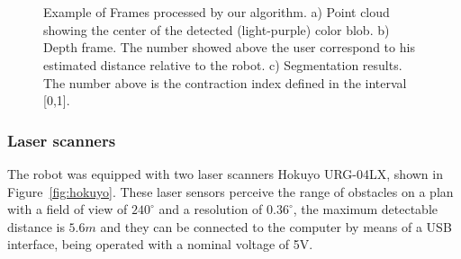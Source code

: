 \begin{figure}[H]
  \centering 
  \begin{subfigure}[b]{0.3\textwidth}
		\centering
		\caption{}
  \end{subfigure}
  ~
  \begin{subfigure}[b]{0.3\textwidth}
		\centering
		\caption{}
  \end{subfigure}
  ~
  \begin{subfigure}[b]{0.3\textwidth}
		\centering
		\caption{}
  \end{subfigure}
  \caption{Example of Frames processed by our algorithm. a) Point cloud showing the center of the detected (light-purple) color blob. b) Depth frame. The number showed above the user correspond to his estimated distance relative to the robot. c) Segmentation results. The number above is the contraction index defined in the interval [0,1].}\label{fig:segmenta}
   \label{segmentacao}
\end{figure}

\subsubsection{Laser scanners}\label{lasershokuyo}
The robot was equipped with two laser scanners Hokuyo URG-04LX, shown in Figure~\ref{fig:hokuyo}. These laser sensors perceive the range of obstacles on a plan with a field of view of $240^\circ$ and a resolution of $0.36^\circ$, the maximum detectable distance is $5.6m$ and they can be connected to the computer by means of a USB interface, being operated with a nominal voltage of 5V.

